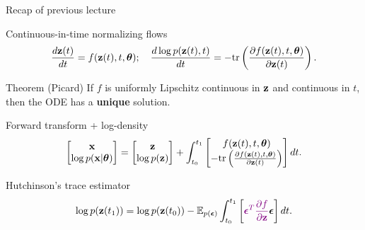 

\usepackage{tikz}

\usetikzlibrary{arrows,shapes,positioning,shadows,trees}

\begin{frame}
\titlepage
\end{frame}
\begin{frame}{Recap of previous lecture}
	\begin{block}{Continuous-in-time normalizing flows}
		\vspace{-0.5cm}
		\[
			\frac{d\mathbf{z}(t)}{dt} = f(\mathbf{z}(t), t, \boldsymbol{\theta}); \quad \frac{d \log p(\mathbf{z}(t), t)}{d t} = - \text{tr} \left( \frac{\partial f (\mathbf{z}(t), t, \boldsymbol{\theta})}{\partial \mathbf{z}(t)} \right).
		\]
		\vspace{-0.7cm}
	\end{block}
	\begin{block}{Theorem (Picard)}
		If $f$ is uniformly Lipschitz continuous in $\mathbf{z}$ and continuous in $t$, then the ODE has a \textbf{unique} solution.
	\end{block}
	\begin{block}{Forward transform + log-density}
		\vspace{-0.4cm}
		\[
			\begin{bmatrix}
				\mathbf{x} \\
				\log p(\mathbf{x} | \boldsymbol{\theta})
			\end{bmatrix}
			= 
			\begin{bmatrix}
				\mathbf{z} \\
				\log p(\mathbf{z})
			\end{bmatrix} + 
			\int_{t_0}^{t_1} 
			\begin{bmatrix}
				f(\mathbf{z}(t), t, \boldsymbol{\theta}) \\
				- \text{tr} \left( \frac{\partial f(\mathbf{z}(t), t, \boldsymbol{\theta})}{\partial \mathbf{z}(t)} \right) 
			\end{bmatrix} dt.
		\]
		\vspace{-0.4cm}
	\end{block}	
	\begin{block}{Hutchinson's trace estimator}
		\vspace{-0.3cm}
		\[
		   \log p(\mathbf{z}(t_1)) = \log p(\mathbf{z}(t_0)) - \mathbb{E}_{p(\boldsymbol{\epsilon})} \int_{t_0}^{t_1} \left[ {\color{violet}\boldsymbol{\epsilon}^T \frac{\partial f}{\partial \mathbf{z}}} \boldsymbol{\epsilon} \right] dt.
		\]
	\end{block}
\end{frame}
